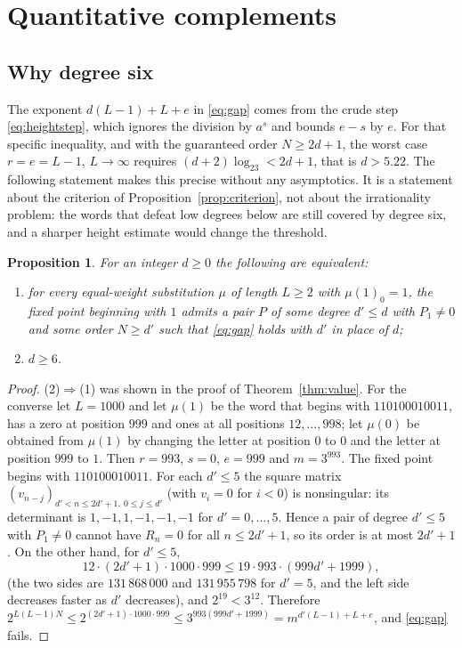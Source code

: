 \documentclass[11pt,reqno]{amsart}
\newtheorem{proposition}[theorem]{Proposition}
\theoremstyle{definition}
\theoremstyle{remark}
\begin{document}
\section{Quantitative complements}\label{sec:quant}

\subsection{Why degree six}
The exponent $d(L-1)+L+e$ in \eqref{eq:gap} comes from the crude step
\eqref{eq:heightstep}, which ignores the division by $a^{s}$ and bounds
$e-s$ by $e$.  For that specific inequality, and with the guaranteed
order $N\ge 2d+1$, the worst case $r=e=L-1$, $L\to\infty$ requires
$(d+2)\log_23<2d+1$, that is $d>5.22$.  The following statement makes this
precise without any asymptotics.  It is a statement about the criterion of
Proposition~\ref{prop:criterion}, not about the irrationality problem: the
words that defeat low degrees below are still covered by degree six, and a
sharper height estimate would change the threshold.

\begin{proposition}\label{prop:sharp}
For an integer $d\ge 0$ the following are equivalent:
\begin{enumerate}
\item for every equal-weight substitution $\mu$ of length $L\ge 2$ with
$\mu(1)_0=1$, the fixed point beginning with $1$ admits a pair $P$ of some
degree $d'\le d$ with $P_1\ne 0$ and some order $N\ge d'$ such that
\eqref{eq:gap} holds with $d'$ in place of $d$;
\item $d\ge 6$.
\end{enumerate}
\end{proposition}

\begin{proof}
(2)$\Rightarrow$(1) was shown in the proof of Theorem~\ref{thm:value}.  For
the converse let $L=1000$ and let $\mu(1)$ be the word that begins with
$110100010011$, has a zero at position $999$ and ones at all positions
$12,\dots,998$; let $\mu(0)$ be obtained from $\mu(1)$ by changing the
letter at position $0$ to $0$ and the letter at position $999$ to $1$.
Then $r=993$, $s=0$, $e=999$ and $m=3^{993}$.  The fixed point begins with
$110100010011$.  For each $d'\le 5$ the square matrix
$(v_{n-j})_{d'<n\le 2d'+1,\ 0\le j\le d'}$ (with $v_i=0$ for $i<0$) is
nonsingular: its determinant is $1,-1,1,-1,-1,-1$ for $d'=0,\dots,5$.
Hence a pair of degree $d'\le 5$ with $P_1\ne 0$ cannot have $R_n=0$ for
all $n\le 2d'+1$, so its order is at most $2d'+1$.  On the other hand, for
$d'\le 5$,
\[
  12\cdot(2d'+1)\cdot 1000\cdot 999\le 19\cdot 993\cdot(999d'+1999),
\]
(the two sides are $131\,868\,000$ and $131\,955\,798$ for $d'=5$, and the
left side decreases faster as $d'$ decreases), and $2^{19}<3^{12}$.
Therefore $2^{L(L-1)N}\le 2^{(2d'+1)\cdot 1000\cdot 999}\le
3^{993(999d'+1999)}=m^{d'(L-1)+L+e}$, and \eqref{eq:gap} fails.
\end{proof}
\end{document}
